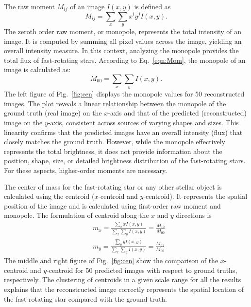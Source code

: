 The raw moment $M_{ij}$ of an image $I(x, y)$ is defined as \citep{hu1962visual}
\begin{equation}
	M_{ij} = \sum_{x} \sum_{y} x^i y^j I(x, y).
	\label{eqn:Mom}
\end{equation}
The zeroth order raw moment, or monopole, represents the total intensity of an image. It is computed by summing all pixel values across the image, yielding an overall intensity measure. In this context, analyzing the monopole provides the total flux of fast-rotating stars. According to Eq.~\eqref{eqn:Mom}, the monopole of an image is calculated as:
\begin{equation}
	M_{00} = \sum_{x} \sum_{y} I(x, y).
\end{equation}
The left figure of Fig.~\ref{fig:cen} displays the monopole values for 50 reconstructed images. The plot reveals a linear relationship between the monopole of the ground truth (real image) on the $x$-axis and that of the predicted (reconstructed) image on the $y$-axis, consistent across sources of varying shapes and sizes. This linearity confirms that the predicted images have an overall intensity (flux) that closely matches the ground truth. However, while the monopole effectively represents the total brightness, it does not provide information about the position, shape, size, or detailed brightness distribution of the fast-rotating stars. For these aspects, higher-order moments are necessary.

The center of mass for the fast-rotating star or any other stellar object is calculated using the centroid ($x$-centroid and $y$-centroid). It represents the spatial position of the image and is calculated using first-order raw moment and monopole. The formulation of centroid along the $x$ and $y$ directions is
\begin{equation}
	\begin{aligned}
		&m_x = \frac{\sum_{x} x I(x,y)}{\sum_{x} \sum_{y} I(x, y)} = \frac{M_{10}}{M_{00}} \\
		&m_y = \frac{\sum_{y} y I(x,y)}{\sum_{x} \sum_{y} I(x, y)} = \frac{M_{01}}{M_{00}}
	\end{aligned}  
\end{equation}
The middle and right figure of Fig.~\ref{fig:cen} show the comparison of the $x$-centroid and $y$-centroid for 50 predicted images with respect to ground truths, respectively. The clustering of centroids in a given scale range for all the results explains that the reconstructed image correctly represents the spatial location of the fast-rotating star compared with the ground truth.

